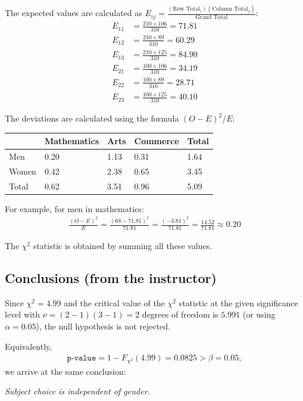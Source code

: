 The expected values are calculated as $E_{ij} = \frac{(\text{Row Total}_i)(\text{Column Total}_j)}{\text{Grand Total}}$:
\begin{align}
	E_{11} &= \frac{210 \times 106}{310} = 71.81 \\
	E_{12} &= \frac{210 \times 89}{310} = 60.29 \\
	E_{13} &= \frac{210 \times 125}{310} = 84.90 \\
	E_{21} &= \frac{100 \times 106}{310} = 34.19 \\
	E_{22} &= \frac{100 \times 89}{310} = 28.71 \\
	E_{23} &= \frac{100 \times 125}{310} = 40.10
\end{align}

The deviations are calculated using the formula $(O-E)^2/E$:
\begin{center}
	\begin{tabular}{|l|l|l|l|l|}\hline
		& Mathematics & Arts & Commerce & Total\\\hline
		Men & 0.20 & 1.13 & 0.31 & 1.64\\\hline
		Women & 0.42 & 2.38 & 0.65 & 3.45\\\hline
		Total & 0.62 & 3.51 & 0.96 & 5.09\\\hline
	\end{tabular}
\end{center}

For example, for men in mathematics:
\begin{align}
	\frac{(O-E)^2}{E} = \frac{(68-71.81)^2}{71.81} = \frac{(-3.81)^2}{71.81} = \frac{14.52}{71.81} \approx 0.20
\end{align}

The $\chi^2$ statistic is obtained by summing all these values.

\subsection{Conclusions (from the instructor)}
Since $\chi^2= 4.99$ and the critical value of the $\chi^2$ statistic at the given significance level with $\nu=(2-1)(3-1)=2$ degrees of freedom is $5.991$ (or using $\alpha=0.05$), the null hypothesis is not rejected.

Equivalently,
\begin{align}
	\texttt{p-value}=1- F_{\chi^{2}}(4.99)=0.0825>\beta=0.05,
\end{align}
we arrive at the same conclusion:
\begin{center}
	\emph{Subject choice is independent of gender.}
\end{center}
